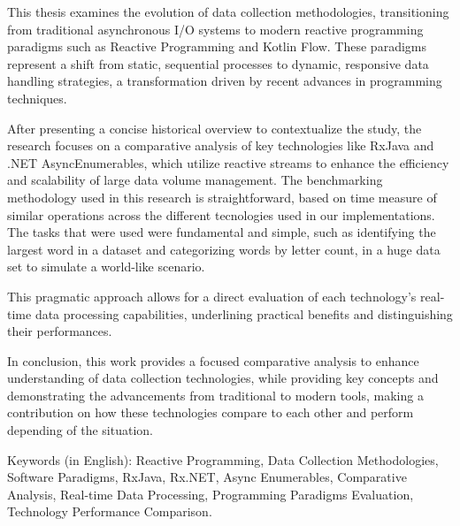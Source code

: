 \abstractEN %

This thesis examines the evolution of data collection methodologies, transitioning from traditional asynchronous I/O systems to modern reactive programming paradigms such as Reactive Programming and Kotlin Flow. These paradigms represent a shift from static, sequential processes to dynamic, responsive data handling strategies, a transformation driven by recent advances in programming techniques.

After presenting a concise historical overview to contextualize the study, the research focuses on a comparative analysis of key technologies like RxJava and .NET AsyncEnumerables, which utilize reactive streams to enhance the efficiency and scalability of large data volume management. The benchmarking methodology used in this research is straightforward, based on time measure of similar operations across the different tecnologies used in our implementations. The tasks that were used were fundamental and simple, such as identifying the largest word in a dataset and categorizing words by letter count, in a huge data set to simulate a world-like scenario.

This pragmatic approach allows for a direct evaluation of each technology's real-time data processing capabilities, underlining practical benefits and distinguishing their performances. 

In conclusion, this work provides a focused comparative analysis to enhance understanding of data collection technologies, while providing key concepts and demonstrating the advancements from traditional to modern tools, making a contribution on how these technologies compare to each other and perform depending of the situation.

\begin{keywords}
    Keywords (in English): Reactive Programming, Data Collection Methodologies, Software Paradigms, RxJava, Rx.NET, Async Enumerables, Comparative Analysis, Real-time Data Processing, Programming Paradigms Evaluation, Technology Performance Comparison.
\end{keywords}